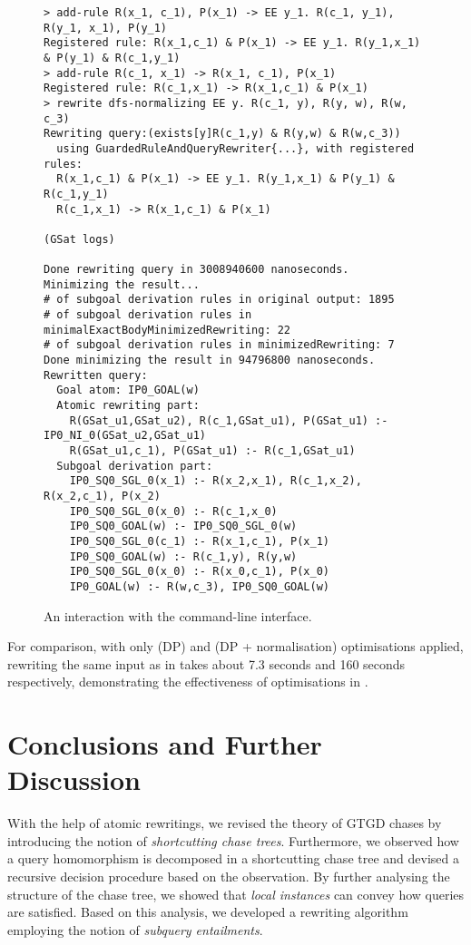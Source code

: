 \documentclass[12pt]{report}
\theoremstyle{plain}
\theoremstyle{definition}
\begin{document}
\begin{figure}
\begin{Verbatim}[frame=single, fontsize=\fontsize{9}{10}]
> add-rule R(x_1, c_1), P(x_1) -> EE y_1. R(c_1, y_1), R(y_1, x_1), P(y_1) 
Registered rule: R(x_1,c_1) & P(x_1) -> EE y_1. R(y_1,x_1) & P(y_1) & R(c_1,y_1)
> add-rule R(c_1, x_1) -> R(x_1, c_1), P(x_1)
Registered rule: R(c_1,x_1) -> R(x_1,c_1) & P(x_1)
> rewrite dfs-normalizing EE y. R(c_1, y), R(y, w), R(w, c_3)
Rewriting query:(exists[y]R(c_1,y) & R(y,w) & R(w,c_3))
  using GuardedRuleAndQueryRewriter{...}, with registered rules:
  R(x_1,c_1) & P(x_1) -> EE y_1. R(y_1,x_1) & P(y_1) & R(c_1,y_1)
  R(c_1,x_1) -> R(x_1,c_1) & P(x_1)

(GSat logs)

Done rewriting query in 3008940600 nanoseconds.
Minimizing the result...
# of subgoal derivation rules in original output: 1895
# of subgoal derivation rules in minimalExactBodyMinimizedRewriting: 22
# of subgoal derivation rules in minimizedRewriting: 7
Done minimizing the result in 94796800 nanoseconds.
Rewritten query:
  Goal atom: IP0_GOAL(w)
  Atomic rewriting part:
    R(GSat_u1,GSat_u2), R(c_1,GSat_u1), P(GSat_u1) :- IP0_NI_0(GSat_u2,GSat_u1)
    R(GSat_u1,c_1), P(GSat_u1) :- R(c_1,GSat_u1)
  Subgoal derivation part:
    IP0_SQ0_SGL_0(x_1) :- R(x_2,x_1), R(c_1,x_2), R(x_2,c_1), P(x_2)
    IP0_SQ0_SGL_0(x_0) :- R(c_1,x_0)
    IP0_SQ0_GOAL(w) :- IP0_SQ0_SGL_0(w)
    IP0_SQ0_SGL_0(c_1) :- R(x_1,c_1), P(x_1)
    IP0_SQ0_GOAL(w) :- R(c_1,y), R(y,w)
    IP0_SQ0_SGL_0(x_0) :- R(x_0,c_1), P(x_0)
    IP0_GOAL(w) :- R(w,c_3), IP0_SQ0_GOAL(w)
\end{Verbatim}
\caption{An interaction with the command-line interface.}
\label{figure:example-command-line-interaction}
\end{figure}

For comparison, with only (DP) and (DP + normalisation) optimisations applied, rewriting the same input as in  takes about 7.3 seconds and 160 seconds respectively, demonstrating the effectiveness of optimisations in .

\newpage
\chapter{Conclusions and Further Discussion}

With the help of atomic rewritings, we revised the theory of GTGD chases by introducing the notion of \emph{shortcutting chase trees}. Furthermore, we observed how a query homomorphism is decomposed in a shortcutting chase tree and devised a recursive decision procedure based on the observation. By further analysing the structure of the chase tree, we showed that \emph{local instances} can convey how queries are satisfied. Based on this analysis, we developed a rewriting algorithm employing the notion of \emph{subquery entailments}.
\end{document}
